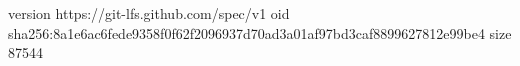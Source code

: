 version https://git-lfs.github.com/spec/v1
oid sha256:8a1e6ac6fede9358f0f62f2096937d70ad3a01af97bd3caf8899627812e99be4
size 87544
